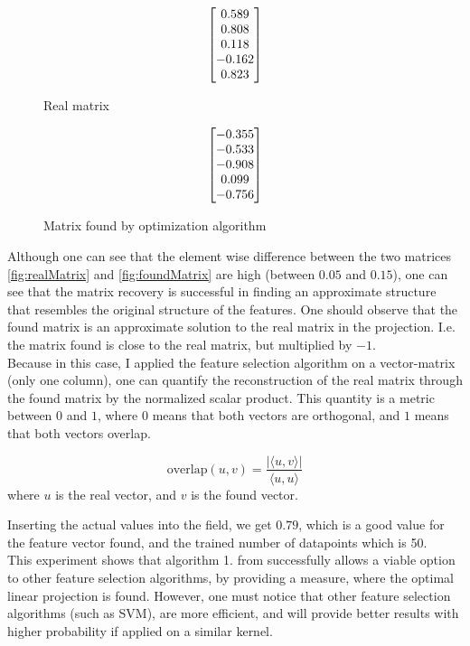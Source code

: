 \begin{figure}[h] 
\begin {minipage}{0.47\textwidth}
  \centering
  \begin{equation} \label{fig:realMatrix}
    \begin{bmatrix} 0.589 \\ 0.808 \\ 0.118 \\ -0.162 \\ 0.823 \end{bmatrix}
  \end{equation}
  \caption{Real matrix}
\end{minipage}
\hfill
\begin {minipage}{0.47\textwidth}
  \centering
  \begin{equation} \label{fig:foundMatrix}
    \okW1
  \end{equation}
  \caption{Matrix found by optimization algorithm}
\end{minipage}
\end{figure}

Although one can see that the element wise difference between the two matrices \ref{fig:realMatrix} and \ref{fig:foundMatrix} are high (between $0.05$ and $0.15$), one can see that the matrix recovery is successful in finding an approximate structure that resembles the original structure of the features.
One should observe that the found matrix is an approximate solution to the real matrix in the projection. I.e. the matrix found is close to the real matrix, but multiplied by $-1$. \\

Because in this case, I applied the feature selection algorithm on a vector-matrix (only one column), one can quantify the reconstruction of the real matrix through the found matrix by the normalized scalar product.
This quantity is a metric between $0$ and $1$, where $0$ means that both vectors are orthogonal, and $1$ means that both vectors overlap.

\begin{equation}
\text{overlap}(u, v) = \frac{| \langle u, v \rangle |}{\langle u, u \rangle}
\end{equation}
where $u$ is the real vector, and $v$ is the found vector.

Inserting the actual values into the field, we get $0.79$, which is a good value for the feature vector found, and the trained number of datapoints which is 50. \\
 
 This experiment shows that algorithm 1. from \citep{Tripathy} successfully allows a viable option to other feature selection algorithms, by providing a measure, where the optimal linear projection is found. 
 However, one must notice that other feature selection algorithms (such as SVM), are more efficient, and will provide better results with higher probability if applied on a similar kernel. \\
 
